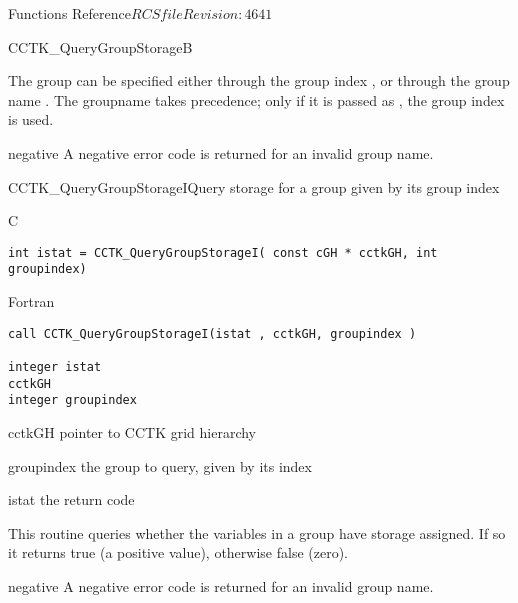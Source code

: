 \begin{cactuspart}{ Functions Reference}{$RCSfile$}{$Revision: 4641 $}
\begin{FunctionDescription}{CCTK\_QueryGroupStorageB}{}
\begin{Discussion}
The group can be specified either through the group index
, or through the group name .  The groupname
takes precedence; only if it is passed as , the group index
is used.
\end{Discussion}
\begin{ErrorSection}
\begin{Error}{negative}
A negative error code is returned for an invalid group name.
\end{Error}
\end{ErrorSection}
\end{FunctionDescription}

\begin{FunctionDescription}{CCTK\_QueryGroupStorageI}{Query storage for a group given by its group index}
\label{CCTK-QueryGroupStorageI}
\begin{SynopsisSection}
\begin{Synopsis}{C}
\begin{verbatim}int istat = CCTK_QueryGroupStorageI( const cGH * cctkGH, int groupindex)\end{verbatim}
\end{Synopsis}
\begin{Synopsis}{Fortran}
\begin{verbatim}call CCTK_QueryGroupStorageI(istat , cctkGH, groupindex )

integer istat
cctkGH
integer groupindex\end{verbatim}
\end{Synopsis}
\end{SynopsisSection}
\begin{ParameterSection}
\begin{Parameter}{cctkGH}
pointer to CCTK grid hierarchy
\end{Parameter}
\begin{Parameter}{groupindex}
the group to query, given by its index
\end{Parameter}
\begin{Parameter}{istat}
the return code
\end{Parameter}
\end{ParameterSection}
\begin{Discussion}
This routine queries whether the variables in a group have storage assigned.
If so it returns true (a positive value), otherwise false (zero).
\end{Discussion}
\begin{ErrorSection}
\begin{Error}{negative}
A negative error code is returned for an invalid group name.
\end{Error}
\end{ErrorSection}
\end{FunctionDescription}





\end{cactuspart}
